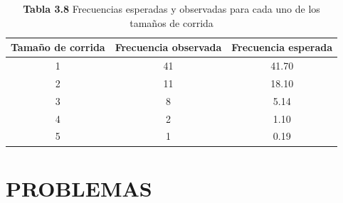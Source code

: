 \documentclass[11pt,letterpaper]{report}
\begin{document}
\begin{table}[H]
\centering
\caption*{\textbf{Tabla 3.8} Frecuencias esperadas y observadas para cada uno de los tamaños de corrida}
\begin{tabular}{ccc}
\toprule
Tamaño de corrida & Frecuencia observada & Frecuencia esperada \\
\midrule
1 & 41 & 41.70 \\
2 & 11 & 18.10 \\
3 & 8 & 5.14 \\
4 & 2 & 1.10 \\
5 & 1 & 0.19 \\
\bottomrule
\end{tabular}
\end{table}

\section*{PROBLEMAS}
\end{document}
